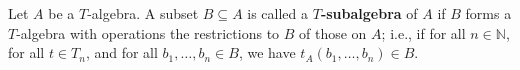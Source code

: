Let $A$ be a $T$-algebra. A subset $B \subseteq A$ is called a \textbf{$T$-subalgebra} of $A$ if $B$ forms a $T$-algebra with operations the restrictions to $B$ of those on $A$; i.e., if for all $n \in \mathbb{N}$, for all $t \in T_n$, and for all $b_1, \ldots, b_n \in B$, we have $t_A(b_1, \ldots, b_n) \in B$.
